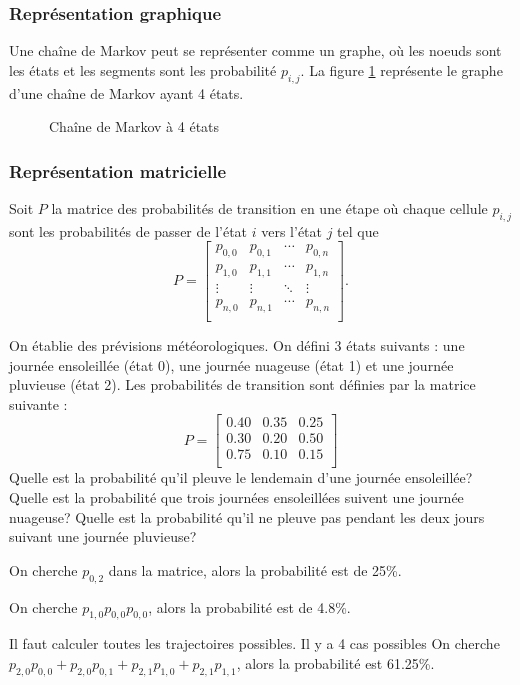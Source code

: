 \documentclass[11pt]{article}
\theoremstyle{remark}
\theoremstyle{definition}
\begin{document}
\subsubsection{Représentation graphique}
Une chaîne de Markov peut se représenter comme un graphe, où les noeuds sont
les états et les segments sont les probabilité $p_{i,j}$. La figure
\ref{fig:markov_graph} représente le graphe d'une chaîne de Markov ayant 4
états.

\begin{figure}[H]
	\centering
	
	\caption{Chaîne de Markov à 4 états}
	\label{fig:markov_graph}
\end{figure}

\subsubsection{Représentation matricielle}
Soit $P$ la matrice des probabilités de transition en une étape où chaque
cellule $p_{i,j}$ sont les probabilités de passer de l'état $i$ vers l'état $j$
tel que
\begin{equation*}
	P=\left[
		\begin{matrix}
			p_{0,0} & p_{0,1} & \cdots & p_{0,n}\\
			p_{1,0} & p_{1,1} & \cdots & p_{1,n}\\
			\vdots  & \vdots  & \ddots & \vdots \\
			p_{n,0} & p_{n,1} & \cdots & p_{n,n}\\
		\end{matrix}
	\right].
\end{equation*}

\begin{exemple}
	On établie des prévisions météorologiques. On défini 3 états suivants : une
	journée ensoleillée (état 0), une journée nuageuse (état 1) et une journée
	pluvieuse (état 2). Les probabilités de transition sont définies par la
	matrice suivante :
	\begin{equation*}
		P=\left[
			\begin{matrix}
				0.40 & 0.35 & 0.25\\
				0.30 & 0.20 & 0.50\\
				0.75 & 0.10 & 0.15\\
			\end{matrix}
		\right]
	\end{equation*}
	Quelle est la probabilité qu'il pleuve le lendemain d'une journée
	ensoleillée? Quelle est la probabilité que trois journées ensoleillées
	suivent une journée nuageuse? Quelle est la probabilité qu'il ne pleuve pas
	pendant les deux jours suivant une journée pluvieuse?

	On cherche $p_{0,2}$ dans la matrice, alors la probabilité est de 25\%.

	On cherche $p_{1,0}p_{0,0}p_{0,0}$, alors la probabilité est de 4.8\%.

	Il faut calculer toutes les trajectoires possibles. Il y a 4 cas possibles
	On cherche $p_{2,0}p_{0,0}+p_{2,0}p_{0,1}+p_{2,1}p_{1,0}+p_{2,1}p_{1,1}$,
	alors la probabilité est 61.25\%.
\end{exemple}
\end{document}
